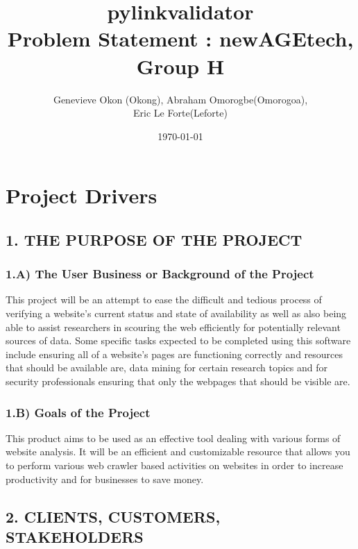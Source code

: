 \documentclass[12pt]{article}
\begin{document}
\title{pylinkvalidator \\
 Problem Statement : newAGEtech, Group H }
\author{Genevieve Okon (Okong), Abraham Omorogbe(Omorogoa),\\
 Eric Le Forte(Leforte)}
\date{\today}
\maketitle

\tableofcontents

\section{Project Drivers}

\subsection{1. THE PURPOSE OF THE PROJECT}

\subsubsection{1.A) The User Business or Background of the Project}
This project will be an attempt to ease the difficult and tedious process of verifying a website’s current status and state of availability as well as also being able to assist researchers in scouring the web efficiently for potentially relevant sources of data. Some specific tasks expected to be completed using this software include ensuring all of a website’s pages are functioning correctly and resources that should be available are, data mining for certain research topics and for security professionals ensuring that only the webpages that should be visible are.

\subsubsection{1.B) Goals of the Project}
This product aims to be used as an effective tool dealing with various forms of website analysis. It will be an efficient and customizable resource that allows you to perform various web crawler based activities on websites in order to increase productivity and for businesses to save money.


\subsection{2. CLIENTS, CUSTOMERS, STAKEHOLDERS}
\end{document}
